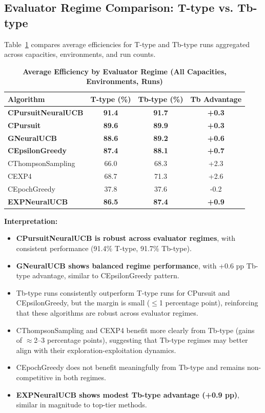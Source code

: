 \documentclass[12pt,a4paper]{article}
\newcommand{\performance}[1]{\textcolor{performancecolor}{\textbf{#1}}}
\newcommand{\legacy}[1]{\textcolor{legacycolor}{\textbf{#1}}}
\newcommand{\neural}[1]{\textcolor{neuralcolor}{\textbf{#1}}}
\begin{document}
\newpage
\subsection{Evaluator Regime Comparison: T-type vs. Tb-type}

Table~\ref{tab:regime-comparison} compares average efficiencies for T-type and Tb-type runs aggregated across capacities, environments, and run counts.

\begin{table}[H]
\centering
\caption{\performance{Average Efficiency by Evaluator Regime (All Capacities, Environments, Runs)}}
\label{tab:regime-comparison}
\begin{tabular}{|l|c|c|c|}
\hline
\textbf{Algorithm} & \textbf{T-type (\%)} & \textbf{Tb-type (\%)} & \textbf{Tb Advantage} \\
\hline
\hline
\neural{CPursuitNeuralUCB}   & \neural{91.4}     & \neural{91.7}     & \neural{+0.3} \\
\performance{CPursuit}        & \performance{89.6} & \performance{89.9} & \performance{+0.3} \\
\neural{GNeuralUCB}          & \neural{88.6}     & \neural{89.2}     & \neural{+0.6} \\
\performance{CEpsilonGreedy} & \performance{87.4} & \performance{88.1} & \performance{+0.7} \\
CThompsonSampling            & 66.0              & 68.3              & +2.3 \\
CEXP4                        & 68.7              & 71.3              & +2.6 \\
CEpochGreedy                 & 37.8              & 37.6              & -0.2 \\
\legacy{EXPNeuralUCB}        & \legacy{86.5}     & \legacy{87.4}     & \legacy{+0.9} \\
\hline
\end{tabular}
\end{table}

\textbf{Interpretation:}
\begin{itemize}
\item \neural{CPursuitNeuralUCB is robust across evaluator regimes}, with consistent performance (91.4\% T-type, 91.7\% Tb-type).
\item \neural{GNeuralUCB shows balanced regime performance}, with +0.6 pp Tb-type advantage, similar to CEpsilonGreedy pattern.
\item Tb-type runs consistently outperform T-type runs for CPursuit and CEpsilonGreedy, but the margin is small ($\leq$1 percentage point), reinforcing that these algorithms are robust across evaluator regimes.
\item CThompsonSampling and CEXP4 benefit more clearly from Tb-type (gains of $\approx$2–3 percentage points), suggesting that Tb-type regimes may better align with their exploration-exploitation dynamics.
\item CEpochGreedy does not benefit meaningfully from Tb-type and remains non-competitive in both regimes.
\item \legacy{EXPNeuralUCB shows modest Tb-type advantage (+0.9 pp)}, similar in magnitude to top-tier methods.
\end{itemize}
\end{document}
